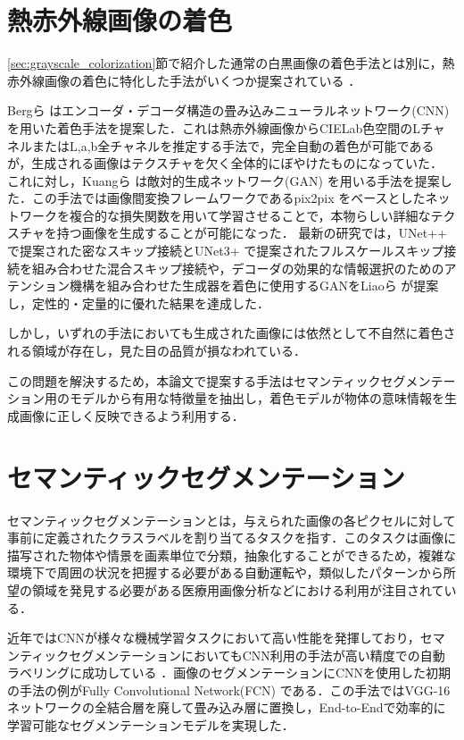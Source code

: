 \documentclass[11pt,dvipdfmx]{ujreport}
\begin{document}
\section{熱赤外線画像の着色}
\ref{sec:grayscale_colorization}節で紹介した通常の白黒画像の着色手法とは別に，熱赤外線画像の着色に特化した手法がいくつか提案されている \cite{Berg_2018_CVPRW_TIR2Lab, KUANG_2020_Infrared_TIC-CGAN, Luo_2022_IEEE_PearlGAN, Liao_2023_IEEE_MUGAN}．\par
Bergら \cite{Berg_2018_CVPRW_TIR2Lab} はエンコーダ・デコーダ構造の畳み込みニューラルネットワーク(CNN)を用いた着色手法を提案した．これは熱赤外線画像からCIELab色空間のLチャネルまたはL,a,b全チャネルを推定する手法で，完全自動の着色が可能であるが，生成される画像はテクスチャを欠く全体的にぼやけたものになっていた．
これに対し，Kuangら \cite{KUANG_2020_Infrared_TIC-CGAN} は敵対的生成ネットワーク(GAN) \cite{Goodfellow_2014_NIPS_GAN} を用いる手法を提案した．この手法では画像間変換フレームワークであるpix2pix \cite{Isola_2017_CVPR_pix2pix} をベースとしたネットワークを複合的な損失関数を用いて学習させることで，本物らしい詳細なテクスチャを持つ画像を生成することが可能になった．
最新の研究では，UNet++ \cite{Zhou_2019_IEEE_UNetPlusPlus} で提案された密なスキップ接続とUNet3+ \cite{Huang_2020_ICASSP_UNet3+} で提案されたフルスケールスキップ接続を組み合わせた混合スキップ接続や，デコーダの効果的な情報選択のためのアテンション機構を組み合わせた生成器を着色に使用するGANをLiaoら \cite{Liao_2023_IEEE_MUGAN} が提案し，定性的・定量的に優れた結果を達成した．\par
しかし，いずれの手法においても生成された画像には依然として不自然に着色される領域が存在し，見た目の品質が損なわれている．\par
この問題を解決するため，本論文で提案する手法はセマンティックセグメンテーション用のモデルから有用な特徴量を抽出し，着色モデルが物体の意味情報を生成画像に正しく反映できるよう利用する．

\section{セマンティックセグメンテーション}
セマンティックセグメンテーションとは，与えられた画像の各ピクセルに対して事前に定義されたクラスラベルを割り当てるタスクを指す．このタスクは画像に描写された物体や情景を画素単位で分類，抽象化することができるため，複雑な環境下で周囲の状況を把握する必要がある自動運転や，類似したパターンから所望の領域を発見する必要がある医療用画像分析などにおける利用が注目されている．\par
近年ではCNNが様々な機械学習タスクにおいて高い性能を発揮しており，セマンティックセグメンテーションにおいてもCNN利用の手法が高い精度での自動ラベリングに成功している \cite{Long_2015_CVPR_FCN, Badrinarayanan_2015_ArXiv_SegNet, Ronnenberger_2015_MICCAI_UNet, Chen_2018_ECCV_DeepLabv3plus}．画像のセグメンテーションにCNNを使用した初期の手法の例がFully Convolutional Network(FCN) \cite{Long_2015_CVPR_FCN} である．この手法ではVGG-16 \cite{Simonyan_2015_ICLR_VGG} ネットワークの全結合層を廃して畳み込み層に置換し，End-to-Endで効率的に学習可能なセグメンテーションモデルを実現した．
\end{document}
